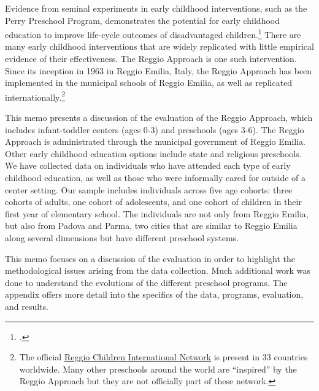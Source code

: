 Evidence from seminal experiments in early childhood interventions, such as the Perry Preschool Program, demonstrates the potential for early childhood education to improve life-cycle outcomes of disadvantaged children.\footnote{\citet{Heckman_Moon_etal_2010_QE, Elango_Hojman_etal_2016_Early-Edu}.} There are many early childhood interventions that are widely replicated with little empirical evidence of their effectiveness. The Reggio Approach is one such intervention. Since its inception in 1963 in Reggio Emilia, Italy, the Reggio Approach has been implemented in the municipal schools of Reggio Emilia, as well as replicated internationally.\footnote{The official \href{http://www.reggiochildren.it/network/?lang=en}{Reggio Children International Network} is present in 33 countries worldwide. Many other preschools around the world are ``inspired'' by the Reggio Approach but they are not officially part of these network.}

This memo presents a discussion of the evaluation of the Reggio Approach, which includes infant-toddler centers (ages 0-3) and preschools (ages 3-6). The Reggio Approach is administrated through the municipal government of Reggio Emilia. Other early childhood education options include state and religious preschools. We have collected data on individuals who have attended each type of early childhood education, as well as those who were informally cared for outside of a center setting. Our sample includes individuals across five age cohorts: three cohorts of adults, one cohort of adolescents, and one cohort of children in their first year of elementary school. The individuals are not only from Reggio Emilia, but also from Padova and Parma, two cities that are similar to Reggio Emilia along several dimensions but have different preschool systems. 

This memo focuses on a discussion of the evaluation in order to highlight the methodological issues arising from the data collection. Much additional work was done to understand the evolutions of the different preschool programs. The appendix offers more detail into the specifics of the data, programs, evaluation, and results.
